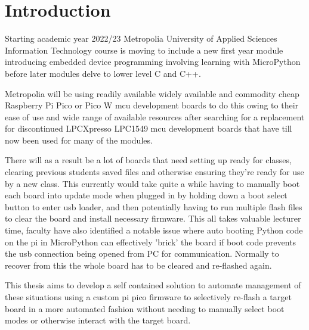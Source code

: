 
\chapter{Introduction}

Starting academic year 2022/23 Metropolia University of Applied Sciences Information Technology course is moving to include a new first year module introducing embedded device programming involving learning with MicroPython before later modules delve to lower level C and C++.

Metropolia will be using readily available widely available and commodity cheap Raspberry Pi Pico or Pico W \gls{mcu}  development boards to do this owing to their ease of use and wide range of available resources after searching for a replacement for discontinued LPCXpresso  LPC1549 \gls{mcu} development boards that have till now been used for many of the modules.

There will as a result be a lot of boards that need setting up ready for classes, clearing previous students saved files and otherwise ensuring they're ready for use by a new class. This currently would take quite a while having to manually boot each board into update mode when plugged in by holding down a boot select button to enter \gls{usb} loader, and then potentially having to run multiple flash files to clear the board and install necessary firmware. This all takes valuable lecturer time, faculty have also identified a notable issue where auto booting Python code on the pi in MicroPython can effectively 'brick' the board if boot code prevents the \gls{usb} connection being opened from PC for communication. Normally to recover from this the whole board has to be cleared and re-flashed again.

This thesis aims to develop a self contained solution to automate management of these situations using a custom pi pico firmware to selectively re-flash a target board in a more automated fashion without needing to manually select boot modes or otherwise interact with the target board.
\pagebreak 